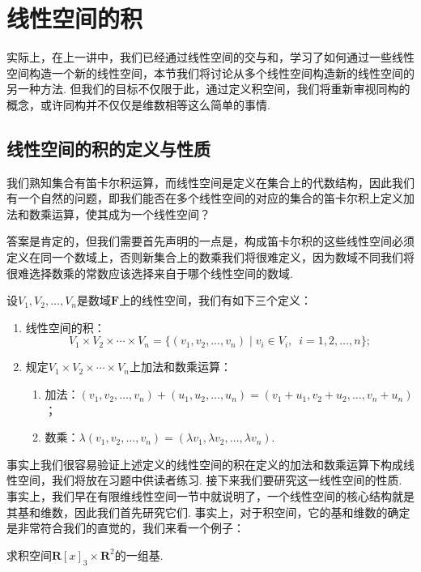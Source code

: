 \section{线性空间的积}

实际上，在上一讲中，我们已经通过线性空间的交与和，学习了如何通过一些线性空间构造一个新的线性空间，本节我们将讨论从多个线性空间构造新的线性空间的另一种方法. 但我们的目标不仅限于此，通过定义积空间，我们将重新审视同构的概念，或许同构并不仅仅是维数相等这么简单的事情.

\subsection{线性空间的积的定义与性质}

我们熟知集合有笛卡尔积运算，而线性空间是定义在集合上的代数结构，因此我们有一个自然的问题，即我们能否在多个线性空间的对应的集合的笛卡尔积上定义加法和数乘运算，使其成为一个线性空间？

答案是肯定的，但我们需要首先声明的一点是，构成笛卡尔积的这些线性空间必须定义在同一个数域上，否则新集合上的数乘我们将很难定义，因为数域不同我们将很难选择数乘的常数应该选择来自于哪个线性空间的数域.
\begin{definition}\label{def:8:积空间}
    设$V_1,V_2,\ldots,V_n$是数域$\mathbf{F}$上的线性空间，我们有如下三个定义：
    \begin{enumerate}
        \item 线性空间的积：
              \[V_1 \times V_2 \times \cdots \times V_n=\{(v_1,v_2,\ldots,v_n)\mid v_i \in V_i,\enspace i=1,2,\ldots,n\};\]

        \item 规定$V_1 \times V_2 \times \cdots \times V_n$上加法和数乘运算：
              \begin{enumerate}
                  \item 加法：$(v_1,v_2,\ldots,v_n)+(u_1,u_2,\ldots,u_n)=(v_1+u_1,v_2+u_2,\ldots,v_n+u_n)$；

                  \item 数乘：$\lambda(v_1,v_2,\ldots,v_n)=(\lambda v_1,\lambda v_2,\ldots,\lambda v_n)$.
              \end{enumerate}
    \end{enumerate}
\end{definition}

事实上我们很容易验证上述定义的线性空间的积在定义的加法和数乘运算下构成线性空间，我们将放在习题中供读者练习. 接下来我们要研究这一线性空间的性质. 事实上，我们早在有限维线性空间一节中就说明了，一个线性空间的核心结构就是其基和维数，因此我们首先研究它们. 事实上，对于积空间，它的基和维数的确定是非常符合我们的直觉的，我们来看一个例子：
\begin{example}
    求积空间$\mathbf{R}[x]_3\times\mathbf{R}^2$的一组基.
\end{example}

